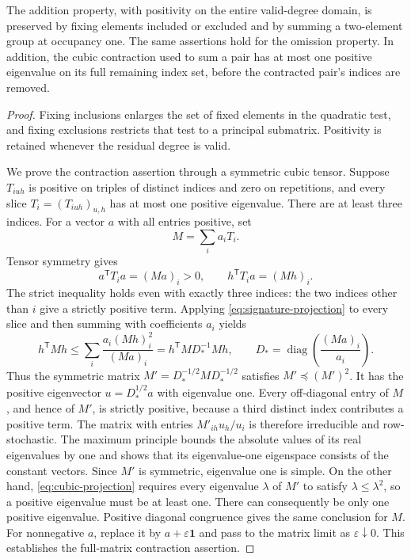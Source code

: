 \begin{lemma}
\label{lem:binary-contraction}
The addition property, with positivity on the entire valid-degree
domain, is preserved by fixing elements included or excluded and by
summing a two-element group at occupancy one.
The same assertions hold for the omission property.
In addition, the cubic contraction used to sum a pair has at most
one positive eigenvalue on its full remaining index set, before the
contracted pair's indices are removed.
\end{lemma}

\begin{proof}
Fixing inclusions enlarges the set of fixed elements in the
quadratic test, and fixing exclusions restricts that test to a
principal submatrix.
Positivity is retained whenever the residual degree is valid.

We prove the contraction assertion through a symmetric cubic
tensor.
Suppose \(T_{iuh}\) is positive on triples of distinct indices and
zero on repetitions, and every slice \(T_i=(T_{iuh})_{u,h}\)
has at most one positive eigenvalue.
There are at least three indices.
For a vector \(a\) with all entries positive, set
\[
 M=\sum_i a_iT_i.
\]
Tensor symmetry gives
\[
 a^{\mathsf T}T_i a=(Ma)_i>0,
 \qquad
 h^{\mathsf T}T_i a=(Mh)_i.
\]
The strict inequality holds even with exactly three indices:
the two indices other than \(i\) give a strictly positive term.
Applying \eqref{eq:signature-projection} to every slice and then
summing with coefficients \(a_i\) yields
\begin{equation}
 h^{\mathsf T}Mh
 \le \sum_i\frac{a_i(Mh)_i^2}{(Ma)_i}
 =h^{\mathsf T}MD_*^{-1}Mh,
 \qquad
 D_*=\operatorname{diag}\left(\frac{(Ma)_i}{a_i}\right).
 \label{eq:cubic-projection}
\end{equation}
Thus the symmetric matrix \(M'=D_*^{-1/2}MD_*^{-1/2}\)
satisfies \(M'\preceq(M')^2\).
It has the positive eigenvector \(u=D_*^{1/2}a\) with eigenvalue
one.
Every off-diagonal entry of \(M\), and hence of \(M'\), is
strictly positive, because a third distinct index contributes
a positive term.
The matrix with entries \(M'_{ih}u_h/u_i\) is therefore
irreducible and row-stochastic.
The maximum principle bounds the absolute values of its real
eigenvalues by one and shows that its eigenvalue-one eigenspace
consists of the constant vectors.
Since \(M'\) is symmetric, eigenvalue one is simple.
On the other hand, \eqref{eq:cubic-projection} requires every
eigenvalue \(\lambda\) of \(M'\) to satisfy
\(\lambda\le\lambda^2\), so a positive eigenvalue must be at least
one.
There can consequently be only one positive eigenvalue.
Positive diagonal congruence gives the same conclusion for \(M\).
For nonnegative \(a\), replace it by \(a+\varepsilon\mathbf 1\)
and pass to the matrix limit as \(\varepsilon\downarrow0\).
This establishes the full-matrix contraction assertion.


\end{proof}
